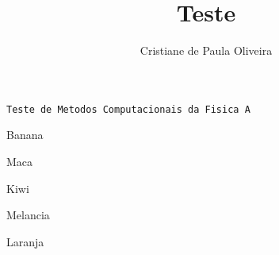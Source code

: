 \documentclass[12pt,a4paper,final]{article}
\title{Teste}
\author{Cristiane de Paula Oliveira}
\begin{document}
\maketitle 

\tt \Huge Teste de Metodos Computacionais da Fisica A

\vspace {1cm}
\item {Banana}
\item {Maca}
\item {Kiwi}
\item {Melancia}
\item {Laranja}
\end{document}
